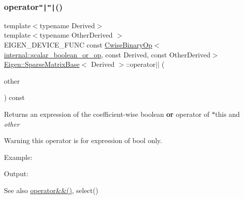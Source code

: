 \subsubsection{\texorpdfstring{operator\texttt{"|}\texttt{"|}()}{operator||()}}
{\footnotesize\ttfamily template$<$typename Derived$>$ \\
template$<$typename Other\+Derived $>$ \\
E\+I\+G\+E\+N\+\_\+\+D\+E\+V\+I\+C\+E\+\_\+\+F\+U\+NC const \mbox{\hyperlink{class_eigen_1_1_cwise_binary_op}{Cwise\+Binary\+Op}}$<$\mbox{\hyperlink{struct_eigen_1_1internal_1_1scalar__boolean__or__op}{internal\+::scalar\+\_\+boolean\+\_\+or\+\_\+op}}, const Derived, const Other\+Derived$>$ \mbox{\hyperlink{class_eigen_1_1_sparse_matrix_base}{Eigen\+::\+Sparse\+Matrix\+Base}}$<$ Derived $>$\+::operator$\vert$$\vert$ (\begin{DoxyParamCaption}\item[{const E\+I\+G\+E\+N\+\_\+\+C\+U\+R\+R\+E\+N\+T\+\_\+\+S\+T\+O\+R\+A\+G\+E\+\_\+\+B\+A\+S\+E\+\_\+\+C\+L\+A\+SS$<$ Other\+Derived $>$ \&}]{other }\end{DoxyParamCaption}) const\hspace{0.3cm}{\ttfamily [inline]}}

\begin{DoxyReturn}{Returns}
an expression of the coefficient-\/wise boolean {\bfseries{or}} operator of {\ttfamily $\ast$this} and {\itshape other} 
\end{DoxyReturn}
\begin{DoxyWarning}{Warning}
this operator is for expression of bool only.
\end{DoxyWarning}
Example\+: 
\begin{DoxyCodeInclude}{0}
\end{DoxyCodeInclude}
 Output\+: 
\begin{DoxyVerbInclude}
\end{DoxyVerbInclude}


\begin{DoxySeeAlso}{See also}
\mbox{\hyperlink{class_eigen_1_1_sparse_matrix_base_a80b919642bae921a0603fefefb51eb52}{operator\&\&()}}, select() 
\end{DoxySeeAlso}
\mbox{\label{class_eigen_1_1_sparse_matrix_base_ac86cc88a4cfef21db6b64ec0ab4c8f0a}} 
